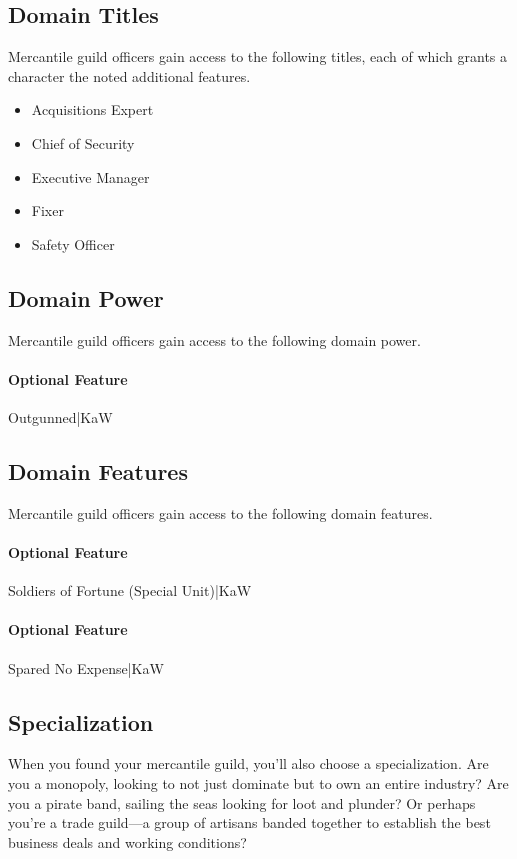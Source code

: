 \documentclass[10pt,a4paper,twoside,bg=print,twocolumn,openany,nodeprecatedcode]{dndbook}
\begin{document}
\subsection{Domain Titles}
Mercantile guild officers gain access to the following titles, each of which grants a character the noted additional features.


\begin{itemize}
\item Acquisitions Expert
\item Chief of Security
\item Executive Manager
\item Fixer
\item Safety Officer
\end{itemize}

\subsection{Domain Power}
Mercantile guild officers gain access to the following domain power.

\paragraph{Optional Feature}
Outgunned|KaW

\subsection{Domain Features}
Mercantile guild officers gain access to the following domain features.

\paragraph{Optional Feature}
Soldiers of Fortune (Special Unit)|KaW

\paragraph{Optional Feature}
Spared No Expense|KaW

\subsection{Specialization}
When you found your mercantile guild, you'll also choose a specialization. Are you a monopoly, looking to not just dominate but to own an entire industry? Are you a pirate band, sailing the seas looking for loot and plunder? Or perhaps you're a trade guild—a group of artisans banded together to establish the best business deals and working conditions?
\end{document}
